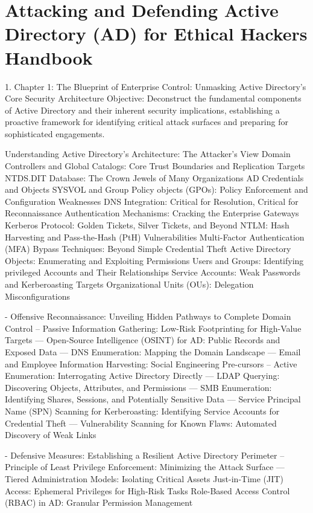 

\chapter{Attacking and Defending Active Directory (AD) for Ethical Hackers Handbook}

1. Chapter 1: The Blueprint of Enterprise Control: Unmasking Active Directory's Core Security Architecture Objective: Deconstruct the fundamental components of Active Directory and their inherent security implications, establishing a proactive framework for identifying critical attack surfaces and preparing for sophisticated engagements.


Understanding Active Directory's Architecture: The Attacker's View
Domain Controllers and Global Catalogs: Core Trust Boundaries and Replication Targets
NTDS.DIT Database: The Crown Jewels of Many Organizations AD Credentials and Objects
SYSVOL and Group Policy objects (GPOs): Policy Enforcement and Configuration Weaknesses
DNS Integration: Critical for Resolution, Critical for Reconnaissance
Authentication Mechanisms: Cracking the Enterprise Gateways
Kerberos Protocol: Golden Tickets, Silver Tickets, and Beyond
NTLM: Hash Harvesting and Pass-the-Hash (PtH) Vulnerabilities
Multi-Factor Authentication (MFA) Bypass Techniques: Beyond Simple Credential Theft
Active Directory Objects: Enumerating and Exploiting Permissions
Users and Groups: Identifying privileged Accounts and Their Relationships
Service Accounts: Weak Passwords and Kerberoasting Targets
Organizational Units (OUs): Delegation Misconfigurations

- Offensive Reconnaissance: Unveiling Hidden Pathways to Complete Domain Control
-- Passive Information Gathering: Low-Risk Footprinting for High-Value Targets
--- Open-Source Intelligence (OSINT) for AD: Public Records and Exposed Data
--- DNS Enumeration: Mapping the Domain Landscape
--- Email and Employee Information Harvesting: Social Engineering Pre-cursors
-- Active Enumeration: Interrogating Active Directory Directly
--- LDAP Querying: Discovering Objects, Attributes, and Permissions
--- SMB Enumeration: Identifying Shares, Sessions, and Potentially Sensitive Data
--- Service Principal Name (SPN) Scanning for Kerberoasting: Identifying Service Accounts for Credential Theft
--- Vulnerability Scanning for Known Flaws: Automated Discovery of Weak Links

- Defensive Measures: Establishing a Resilient Active Directory Perimeter
-- Principle of Least Privilege Enforcement: Minimizing the Attack Surface
--- Tiered Administration Models: Isolating Critical Assets
Just-in-Time (JIT) Access: Ephemeral Privileges for High-Risk Tasks
Role-Based Access Control (RBAC) in AD: Granular Permission Management